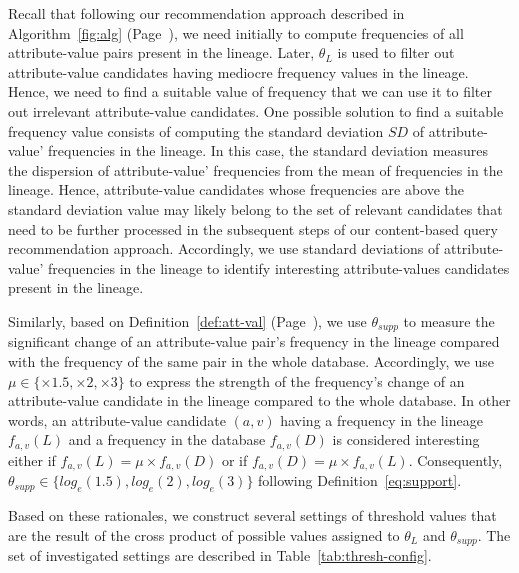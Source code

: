 Recall that following our recommendation approach described in Algorithm~\ref{fig:alg} (Page~\pageref{fig:alg}), we need initially to compute frequencies of all attribute-value pairs present in the lineage. Later, $\theta_{L}$ is used to filter out attribute-value candidates having mediocre frequency values in the lineage. Hence, we need to find a suitable value of frequency that we can use it to filter out irrelevant attribute-value candidates.
One possible solution to find a suitable frequency value consists of computing the standard deviation $SD$ of attribute-value' frequencies in the lineage. In this case, the standard deviation measures the dispersion of attribute-value' frequencies from the mean of frequencies in the lineage. Hence, attribute-value candidates whose frequencies are above the standard deviation value may likely belong to the set of relevant candidates that need to be further processed in the subsequent steps of our content-based query recommendation approach. 
Accordingly, we use standard deviations of attribute-value' frequencies in the lineage to identify interesting attribute-values candidates present in the lineage.


Similarly, based on Definition~\ref{def:att-val} (Page~\pageref{def:att-val}), we use $\theta_{supp}$ to measure the significant change of an attribute-value pair's frequency in the lineage compared with the frequency of the same pair in the whole database.
Accordingly, we use $\mu \in \{ \times 1.5, \times 2, \times 3\} $ to express the strength of the frequency's change of an attribute-value candidate in the lineage compared to the whole database. 
In other words, an attribute-value candidate $(a,v)$ having a frequency in the lineage $f_{a,v}(L)$ and a frequency in the database $f_{a,v}(D)$ is considered interesting either if $f_{a,v}(L)=\mu \times f_{a,v}(D)$ or if $f_{a,v}(D)=\mu \times f_{a,v}(L)$.
Consequently, $\theta_{supp} \in \{log_e(1.5), log_e(2), log_e(3)\}$ following Definition~\ref{eq:support}.


Based on these rationales, we construct several settings of threshold values that are the result of the cross product of possible values assigned to $\theta_{L}$  and $\theta_{supp}$. The set of investigated settings are described in Table~\ref{tab:thresh-config}.

